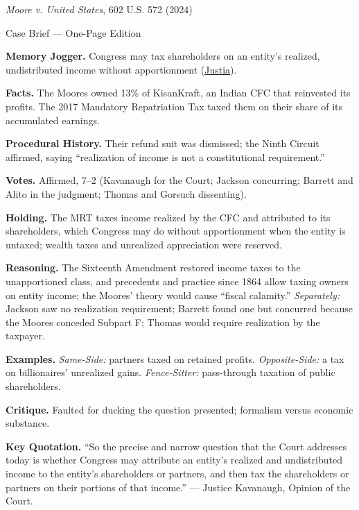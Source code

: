 \documentclass[12pt]{article}
\begin{document}
\begin{center}
{\Large \textit{Moore v. United States}, 602 U.S. 572 (2024)\par}
\vspace{0.3em}
{\normalsize Case Brief --- One-Page Edition\par}
\end{center}

\textbf{Memory Jogger.} Congress may tax shareholders on an entity's realized, undistributed income without apportionment (\href{https://supreme.justia.com/cases/federal/us/602/22-800/}{Justia}).

\textbf{Facts.} The Moores owned 13\% of KisanKraft, an Indian CFC that reinvested its profits. The 2017 Mandatory Repatriation Tax taxed them on their share of its accumulated earnings.

\textbf{Procedural History.} Their refund suit was dismissed; the Ninth Circuit affirmed, saying ``realization of income is not a constitutional requirement.''

\textbf{Votes.} Affirmed, 7--2 (Kavanaugh for the Court; Jackson concurring; Barrett and Alito in the judgment; Thomas and Gorsuch dissenting).

\textbf{Holding.} The MRT taxes income realized by the CFC and attributed to its shareholders, which Congress may do without apportionment when the entity is untaxed; wealth taxes and unrealized appreciation were reserved.

\textbf{Reasoning.} The Sixteenth Amendment restored income taxes to the unapportioned class, and precedents and practice since 1864 allow taxing owners on entity income; the Moores' theory would cause ``fiscal calamity.'' \emph{Separately:} Jackson saw no realization requirement; Barrett found one but concurred because the Moores conceded Subpart F; Thomas would require realization by the taxpayer.

\textbf{Examples.} \emph{Same-Side:} partners taxed on retained profits. \emph{Opposite-Side:} a tax on billionaires' unrealized gains. \emph{Fence-Sitter:} pass-through taxation of public shareholders.

\textbf{Critique.} Faulted for ducking the question presented; formalism versus economic substance.

\textbf{Key Quotation.} ``So the precise and narrow question that the Court addresses today is whether Congress may attribute an entity's realized and undistributed income to the entity's shareholders or partners, and then tax the shareholders or partners on their portions of that income.'' --- Justice Kavanaugh, Opinion of the Court.
\end{document}
